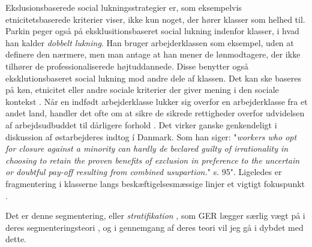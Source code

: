 Ekslusionsbaserede social lukningsstrategier er, som eksempelvis etnicitetsbaserede kriterier viser, ikke kun noget, der hører klasser som helhed til. Parkin peger også på eksklusitionsbaseret social lukning indenfor klasser, i hvad han kalder \emph{dobbelt lukning}. Han bruger arbejderklassen som eksempel, uden at definere den nærmere, men man antage at han mener de lønmodtagere, der ikke tilhører de professionaliserede højtuddannede. Disse benytter også eksklutionsbaseret social lukning mod andre dele af klassen. Det kan ske baseres på køn, etnicitet eller andre sociale kriterier der giver mening i den sociale kontekst \parencite[89]{Parkin1979}. Når en indfødt arbejderklasse lukker sig overfor en arbejderklasse fra et andet land, handler det ofte om at sikre de sikrede rettigheder overfor udvidelsen af arbejdsudbuddet til dårligere forhold \parencite[91]{Parkin1979}. Det virker ganske genkendeligt i diskussion af østarbejderes indtog í Danmark. Som han siger: "\emph{workers who opt for closure against a minority can hardly de beclared guilty of irrationality in choosing to retain the proven benefits of exclusion in preference to the uncertain or doubtful pay-off resulting from combined usupartion.}" s. 95". Ligeledes er fragmentering i klasserne langs beskæftigelsesmæssige linjer et vigtigt fokuspunkt \parencite[81]{Parkin1979}.







Det er denne segmentering, eller \emph{stratifikation} , som GER lægger særlig vægt på i deres segmenteringsteori \parencite[46]{Boje1985}, og i gennemgang af deres teori vil jeg gå i dybdet med dette. 


